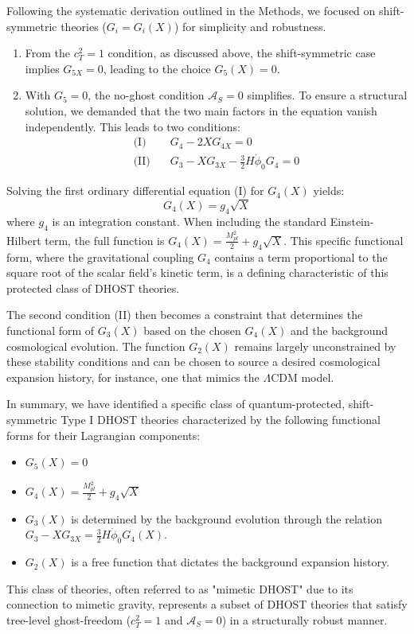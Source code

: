 \documentclass[twocolumn]{aastex631}
\begin{document}
Following the systematic derivation outlined in the Methods, we focused on shift-symmetric theories ($G_i = G_i(X)$) for simplicity and robustness.
\begin{enumerate}
    \item From the $c_T^2=1$ condition, as discussed above, the shift-symmetric case implies $G_{5X}=0$, leading to the choice $G_5(X)=0$.
    \item With $G_5=0$, the no-ghost condition $\mathcal{A}_S=0$ simplifies. To ensure a structural solution, we demanded that the two main factors in the equation vanish independently. This leads to two conditions:
    \begin{align}
    \text{(I)} & \quad G_4 - 2XG_{4X} = 0 \\
    \text{(II)} & \quad G_3 - XG_{3X} - \frac{3}{2}H\dot{\phi}_0 G_4 = 0
    \end{align}
\end{enumerate}
Solving the first ordinary differential equation (I) for $G_4(X)$ yields:
\begin{equation}
G_4(X) = g_4 \sqrt{X}
\end{equation}
where $g_4$ is an integration constant. When including the standard Einstein-Hilbert term, the full function is $G_4(X) = \frac{M_{pl}^2}{2} + g_4\sqrt{X}$. This specific functional form, where the gravitational coupling $G_4$ contains a term proportional to the square root of the scalar field's kinetic term, is a defining characteristic of this protected class of DHOST theories.

The second condition (II) then becomes a constraint that determines the functional form of $G_3(X)$ based on the chosen $G_4(X)$ and the background cosmological evolution. The function $G_2(X)$ remains largely unconstrained by these stability conditions and can be chosen to source a desired cosmological expansion history, for instance, one that mimics the $\Lambda$CDM model.

In summary, we have identified a specific class of quantum-protected, shift-symmetric Type I DHOST theories characterized by the following functional forms for their Lagrangian components:
\begin{itemize}
    \item $G_5(X) = 0$
    \item $G_4(X) = \frac{M_{pl}^2}{2} + g_4 \sqrt{X}$
    \item $G_3(X)$ is determined by the background evolution through the relation $G_3 - XG_{3X} = \frac{3}{2}H\dot{\phi}_0 G_4(X)$.
    \item $G_2(X)$ is a free function that dictates the background expansion history.
\end{itemize}
This class of theories, often referred to as "mimetic DHOST" due to its connection to mimetic gravity, represents a subset of DHOST theories that satisfy tree-level ghost-freedom ($c_T^2=1$ and $\mathcal{A}_S=0$) in a structurally robust manner.
\end{document}
